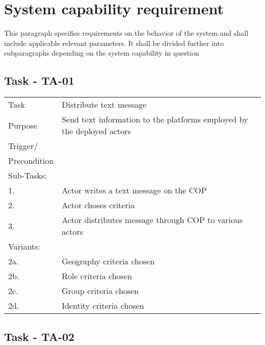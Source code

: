 
\section{System capability requirement}
This paragraph specifies requirements on the behavior of the system and shall include applicable relevant parameters. It shall be divided further into subparagraphs depending on the system capability in question

\subsection{Task - TA-01}

\begin{longtable}{| p{2.5cm}  | p{10cm} |  }
	\hline
	Task & Distribute text message \\
	Purpose & Send text information to the platforms employed by the  deployed actors \\
	Trigger/ &  \\ Precondition &  \\
	\hline
	Sub-Tasks: & \\
	1. & Actor writes a text message on the COP \\
	2. & Actor choses criteria \\
	3. & Actor distributes message through COP to various actors \\
	\hline
	Variants: & \\
	2a. & Geography criteria chosen \\
	2b. & Role criteria chosen\\
	2c. & Group criteria chosen\\
	2d. & Identity criteria chosen\\
	\hline
\end{longtable}

\FloatBarrier
\newpage

\subsection{Task - TA-02}

